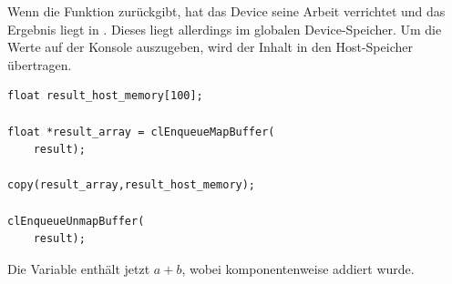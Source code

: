 Wenn die Funktion zurückgibt, hat das Device seine Arbeit verrichtet und das
Ergebnis liegt in . Dieses  liegt allerdings im globalen Device-Speicher. Um die Werte
\PimiddyzB{} auf der Konsole auszugeben, wird der Inhalt in den
Host-Speicher übertragen.

\begin{verbatim}
float result_host_memory[100];

float *result_array = clEnqueueMapBuffer(
    result);

copy(result_array,result_host_memory);

clEnqueueUnmapBuffer(
    result);
\end{verbatim}

Die Variable  enthält jetzt
$a+b$, wobei komponentenweise addiert wurde.
